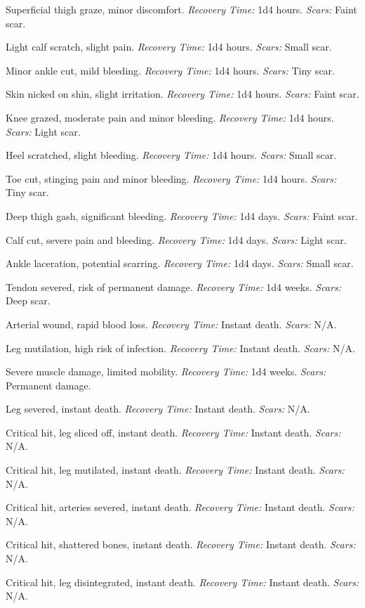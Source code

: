 \documentclass[12pt]{book}  %
\begin{document}
\begin{description}[labelwidth=1.5em, leftmargin=*, itemsep=0.4em]
    \item[1 -] Superficial thigh graze, minor discomfort. \textit{Recovery Time:} 1d4 hours. \textit{Scars:} Faint scar.
    \item[2 -] Light calf scratch, slight pain. \textit{Recovery Time:} 1d4 hours. \textit{Scars:} Small scar.
    \item[3 -] Minor ankle cut, mild bleeding. \textit{Recovery Time:} 1d4 hours. \textit{Scars:} Tiny scar.
    \item[4 -] Skin nicked on shin, slight irritation. \textit{Recovery Time:} 1d4 hours. \textit{Scars:} Faint scar.
    \item[5 -] Knee grazed, moderate pain and minor bleeding. \textit{Recovery Time:} 1d4 hours. \textit{Scars:} Light scar.
    \item[6 -] Heel scratched, slight bleeding. \textit{Recovery Time:} 1d4 hours. \textit{Scars:} Small scar.
    \item[7 -] Toe cut, stinging pain and minor bleeding. \textit{Recovery Time:} 1d4 hours. \textit{Scars:} Tiny scar.
    \item[8 -] Deep thigh gash, significant bleeding. \textit{Recovery Time:} 1d4 days. \textit{Scars:} Faint scar.
    \item[9 -] Calf cut, severe pain and bleeding. \textit{Recovery Time:} 1d4 days. \textit{Scars:} Light scar.
    \item[10 -] Ankle laceration, potential scarring. \textit{Recovery Time:} 1d4 days. \textit{Scars:} Small scar.
    \item[11 -] Tendon severed, risk of permanent damage. \textit{Recovery Time:} 1d4 weeks. \textit{Scars:} Deep scar.
    \item[12 -] Arterial wound, rapid blood loss. \textit{Recovery Time:} Instant death. \textit{Scars:} N/A.
    \item[13 -] Leg mutilation, high risk of infection. \textit{Recovery Time:} Instant death. \textit{Scars:} N/A.
    \item[14 -] Severe muscle damage, limited mobility. \textit{Recovery Time:} 1d4 weeks. \textit{Scars:} Permanent damage.
    \item[15 -] Leg severed, instant death. \textit{Recovery Time:} Instant death. \textit{Scars:} N/A.
    \item[16 -] Critical hit, leg sliced off, instant death. \textit{Recovery Time:} Instant death. \textit{Scars:} N/A.
    \item[17 -] Critical hit, leg mutilated, instant death. \textit{Recovery Time:} Instant death. \textit{Scars:} N/A.
    \item[18 -] Critical hit, arteries severed, instant death. \textit{Recovery Time:} Instant death. \textit{Scars:} N/A.
    \item[19 -] Critical hit, shattered bones, instant death. \textit{Recovery Time:} Instant death. \textit{Scars:} N/A.
    \item[20 -] Critical hit, leg disintegrated, instant death. \textit{Recovery Time:} Instant death. \textit{Scars:} N/A.
\end{description}
\end{document}
